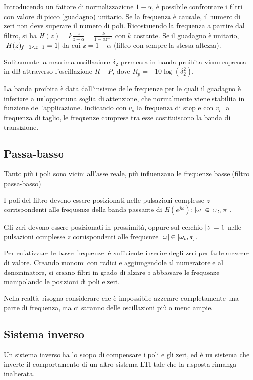 Introducendo un fattore di normalizzazione $1 - \alpha$, è possibile confrontare i filtri con valore di picco (guadagno) unitario. Se la frequenza è causale, il numero di zeri non deve superare il numero di poli.
Ricostruendo la frequenza a partire dal filtro, si ha $H(z) = k \frac{z}{z - \alpha} = \frac{k}{1 - \alpha z^{-1}}$ con $k$ costante. Se il guadagno è unitario, $\left|H(z)_{f=0 \land z=1} = 1\right|$ da cui $k = 1 - \alpha$ (filtro con sempre la stessa altezza).

Solitamente la massima oscillazione $\delta_2$ permessa in banda proibita viene espressa in dB attraverso l'oscillazione $R-P$, dove $R_p = -10\log(\delta_2^2)$. 

La banda proibita è data dall'insieme delle frequenze per le quali il guadagno è inferiore a un'opportuna soglia di attenzione, che normalmente viene stabilita in funzione dell'applicazione. Indicando con $v_s$ la frequenza di stop e con $v_c$ la frequenza di taglio, le frequenze comprese tra esse costituiscono la banda di transizione.

\subsection{Passa-basso}
Tanto più i poli sono vicini all'asse reale, più influenzano le frequenze basse (filtro passa-basso).
 
 I poli del filtro devono essere posizionati nelle pulsazioni complesse $z$ corrispondenti alle frequenze della banda passante di $H(e^{j\omega})$: $\left|\omega\right| \in [\omega_t, \pi]$.
 
 Gli zeri devono essere posizionati in prossimità, oppure sul cerchio $\left|z\right| = 1$ nelle pulsazioni complesse $z$ corrispondenti alle frequenze $\left|\omega\right| \in [\omega_t, \pi]$.
 

Per enfatizzare le basse frequenze, è sufficiente inserire degli zeri per farle crescere di valore. Creando monomi con radici e aggiungendole al numeratore e al denominatore, si creano filtri in grado di alzare o abbassare le frequenze manipolando le posizioni di poli e zeri.

Nella realtà bisogna considerare che è impossibile azzerare completamente una parte di frequenza, ma ci saranno delle oscillazioni più o meno ampie.


\subsection{Sistema inverso}
Un sistema inverso ha lo scopo di compensare i poli e gli zeri, ed è un sistema che inverte il comportamento di un altro sistema LTI tale che la risposta rimanga inalterata.

